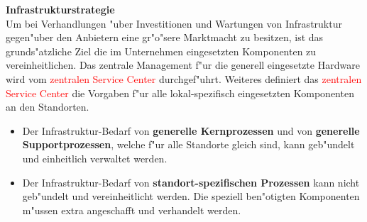 \textbf{Infrastrukturstrategie}\\
Um bei Verhandlungen "uber Investitionen und Wartungen von Infrastruktur gegen"uber den Anbietern eine gr"o"sere Marktmacht zu besitzen, ist das grunds"atzliche Ziel die im Unternehmen eingesetzten Komponenten zu vereinheitlichen. Das zentrale Management f"ur die generell eingesetzte Hardware wird vom \textcolor{red}{zentralen Service Center} durchgef"uhrt. Weiteres definiert das \textcolor{red}{zentralen Service Center} die Vorgaben f"ur alle lokal-spezifisch eingesetzten Komponenten an den Standorten.

\begin{itemize}

	\item Der Infrastruktur-Bedarf von \textbf{generelle Kernprozessen} und von \textbf{generelle Supportprozessen}, welche f"ur alle Standorte gleich sind, kann geb"undelt und einheitlich verwaltet werden. 

	\item Der Infrastruktur-Bedarf von \textbf{standort-spezifischen Prozessen} kann nicht geb"undelt und vereinheitlicht werden. Die speziell ben"otigten Komponenten m"ussen extra angeschafft und verhandelt werden.

\end{itemize}


